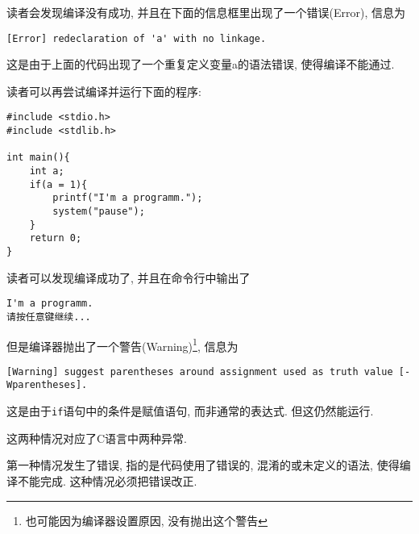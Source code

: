         读者会发现编译没有成功, 并且在下面的信息框里出现了一个错误(Error), 信息为
\begin{lstlisting}
[Error] redeclaration of 'a' with no linkage.
\end{lstlisting}

        这是由于上面的代码出现了一个重复定义变量a的语法错误, 使得编译不能通过.

        读者可以再尝试编译并运行下面的程序:
\begin{lstlisting}
#include <stdio.h>
#include <stdlib.h>

int main(){
    int a;
    if(a = 1){
        printf("I'm a programm.");
        system("pause");
    }
    return 0;
}
\end{lstlisting}

        读者可以发现编译成功了, 并且在命令行中输出了
\begin{lstlisting}
I'm a programm.
请按任意键继续...
\end{lstlisting}

        但是编译器抛出了一个警告(Warning)\footnote{也可能因为编译器设置原因, 没有抛出这个警告}, 信息为
\begin{lstlisting}
[Warning] suggest parentheses around assignment used as truth value [-Wparentheses].
\end{lstlisting}

        这是由于\texttt{if}语句中的条件是赋值语句, 而非通常的表达式. 但这仍然能运行.

        这两种情况对应了C语言中两种异常. 
        
        第一种情况发生了错误, 指的是代码使用了错误的, 混淆的或未定义的语法, 使得编译不能完成. 这种情况必须把错误改正.

